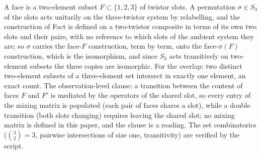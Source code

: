 A face is a two-element subset $F \subset \{1, 2, 3\}$ of twistor slots. A permutation $\sigma \in S_{3}$ of the slots acts unitarily on the three-twistor system by relabelling, and the construction of Fact  is defined on a two-twistor composite in terms of its own two slots and their pairs, with no reference to which slots of the ambient system they are; so $\sigma$ carries the face-$F$ construction, term by term, onto the face-$\sigma(F)$ construction, which is the isomorphism, and since $S_{3}$ acts transitively on two-element subsets the three copies are isomorphic. For the overlap: two distinct two-element subsets of a three-element set intersect in exactly one element, an exact count. The observation-level clause: a transition between the content of faces $F$ and $F'$ is mediated by the operators of the shared slot, so every entry of the mixing matrix is populated (each pair of faces shares a slot), while a double transition (both slots changing) requires leaving the shared slot; no mixing matrix is defined in this paper, and the clause is a reading. The set combinatorics ($\binom{3}{2} = 3$, pairwise intersections of size one, transitivity) are verified by the script.
